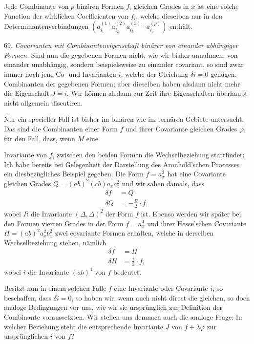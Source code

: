 \glqq Jede Combinante von $p$ binären Formen $f_i$ gleichen Grades in $x$ ist eine solche Function der wirklichen Coefficienten von $f_i$, welche dieselben nur in den Determinantenverbindungen $(\overline a_{i_1}^{(1)}\overline a_{i_2}^{(2)}\overline a_{i_3}^{(3)}\cdots\overline a_{i_p}^{(p)})$ enthält.\grqq{}

69. \textit{Covarianten mit Combinanteneigenschaft binärer von einander abhängiger Formen.} Sind nun die gegebenen Formen nicht, wie wir bisher annahmen, von einander unabhängig, sondern beispielsweise zu einander covariant, so sind zwar immer noch jene Co- und Invarianten $i$, welche der Gleichung $\delta i=0$ genügen, Combinanten der gegebenen Formen; aber dieselben haben alsdann nicht mehr die Eigenschaft $J=i$. Wir können alsdann zur Zeit ihre Eigenschaften überhaupt nicht allgemein discutiren.

Nur ein specieller Fall ist bisher im binären wie im ternären Gebiete untersucht. Das sind die Combinanten einer Form $f$ und ihrer Covariante gleichen Grades $\varphi$, für den Fall, dass, wenn $M$ eine


Invariante von $f$, zwischen den beiden Formen die Wechselbeziehung stattfindet:
Ich habe bereits bei Gelegenheit der Darstellung des Aronhold'schen Processes ein diesbezügliches Beispiel gegeben. Die Form $f=a_x^3$ hat eine Covariante gleichen Grades $Q=(ab)^2(cb)a_x c_x^2$ und wir sahen damals, dass
\[
\begin{aligned}
\delta f &= Q\\
\delta Q &= -\frac{R}{2}\cdot f,
\end{aligned}
\]
wobei $R$ die Invariante $(\varDelta,\varDelta)^2$ der Form $f$ ist. Ebenso werden wir später bei den Formen vierten Grades in der Form $f=a_x^4$ und ihrer Hesse'schen Covariante $H=(ab)^2a_x^2b_x^2$ zwei covariante Formen erhalten, welche in derselben Wechselbeziehung stehen, nämlich
\[
\begin{aligned}
\delta f &= H\\
\delta H &= \frac{i}{3}\cdot f,
\end{aligned}
\]
wobei $i$ die Invariante $(ab)^4$ von $f$ bedeutet.

Besitzt nun in einem solchen Falle $f$ eine Invariante oder Covariante $i$, so beschaffen, dass $\delta i=0$, so haben wir, wenn auch nicht direct die gleichen, so doch analoge Bedingungen vor uns, wie wir sie ursprünglich zur Definition der Combinante voraussetzten. Wir stellen uns demnach auch die analoge Frage: In welcher Beziehung steht die entsprechende Invariante $J$ von $f+\lambda\varphi$ zur ursprünglichen $i$ von $f$?

